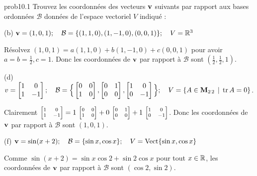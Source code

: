 
\begin{sol}{prob10.1}  Trouvez les coordonnées des vecteurs $\mathbf{v}$ suivants par rapport aux bases ordonnées $\mathcal B$ données de l'espace vectoriel $V$ indiqué :\medskip


(b) $\mathbf{v}=(1,0, 1); \quad\mathcal B=\{(1,1, 0), (1, -1, 0),(0,0,1) \};\quad V=\mathbb{R}^3$

\soln R\'esolvez $ (1,0, 1)=a (1,1, 0)+b (1, -1, 0)+c(0,0,1)$ pour avoir $a=b=\frac12, c=1$. Donc les coordonn\'ees de $\mathbf{v}$ par rapport \`a  $\mathcal B$ sont $(\frac12,\frac12,1)$.\medskip

(d) $v=\bmatrix 1&0\\1&-1\endbmatrix;\quad \mathcal B=\Big\{\bmatrix 0&0\\1&0\endbmatrix, \bmatrix 0&1\\0&0\endbmatrix , \bmatrix 1&0\\0&-1\endbmatrix \Big\};\quad V=\set{A \in  \M_{2 \,2}  \st \tr A=0}$.

\soln Clairement $\scriptsize\bmatrix 1&0\\1&-1\endbmatrix= 1\,\bmatrix 0&0\\1&0\endbmatrix+0\, \bmatrix 0&1\\0&0\endbmatrix + 1\, \bmatrix 1&0\\0&-1\endbmatrix $. Donc les coordonn\'ees de $\mathbf{v}$ par rapport \`a   $\mathcal B$ sont $(1,0,1)$.
\medskip


(f) $\mathbf{v} =\sin (x+2);\quad \mathcal B=\{\sin x, \cos x \};\quad V=\operatorname{ Vect} \normalsize\{\sin x, \cos x \normalsize\}$

\soln Comme $\sin (x+2) = \sin x \cos 2 + \sin 2 \cos x $ pour tout $x \in \mathbb{R}$, les coordonn\'ees de $\mathbf{v}$ par rapport \`a  $\mathcal B$ sont $(\cos 2,\sin 2)$.\medskip

 

\end{sol}



